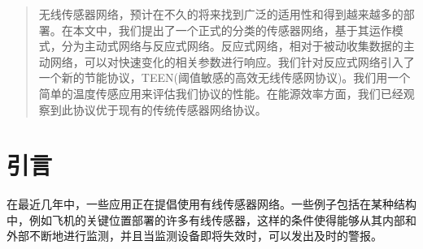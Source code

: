 \documentclass[journal]{IEEEtran}
\begin{document}
\begin{CJK}{UTF8}{gbsn}







\maketitle


\begin{abstract}
无线传感器网络，预计在不久的将来找到广泛的适用性和得到越来越多的部署。在本文中，我们提出了一个正式的分类的传感器网络，基于其运作模式，分为主动式网络与反应式网络。反应式网络，相对于被动收集数据的主动网络，可以对快速变化的相关参数进行响应。我们针对反应式网络引入了一个新的节能协议，TEEN(阈值敏感的高效无线传感网协议)。我们用一个简单的温度传感应用来评估我们协议的性能。在能源效率方面，我们已经观察到此协议优于现有的传统传感器网络协议。
\end{abstract}







%
\IEEEpeerreviewmaketitle



\section{\textbf{引言}}
在最近几年中，一些应用正在提倡使用有线传感器网络。一些例子包括在某种结构中，例如飞机的关键位置部署的许多有线传感器，这样的条件使得能够从其内部和外部不断地进行监测，并且当监测设备即将失效时，可以发出及时的警报。


\end{CJK}
\end{document}
